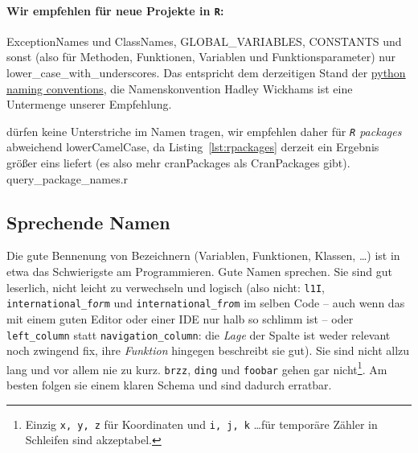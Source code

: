 \documentclass[twoside]{scrreprt}
\providecommand{\R}{\texttt{R}}
\providecommand{\code}[1]{\texttt{#1}}
\begin{document}
\paragraph{Wir empfehlen f\"u{}r neue Projekte in \R{}:}
ExceptionNames und ClassNames, GLOBAL\_VARIABLES, CONSTANTS und sonst (also
f\"u{}r Methoden, Funktionen, Variablen und Funktionsparameter) nur
lower\_case\_with\_underscores.
Das entspricht dem derzeitigen Stand der
\href{http://legacy.python.org/dev/peps/pep-0008/#naming-conventions}{python
  naming conventions}, die Namenskonvention Hadley Wickhams ist eine
  Untermenge unserer Empfehlung.

 d\"urfen keine Unterstriche im Namen
tragen, wir
empfehlen daher f\"u{}r \emph{\R{} packages} abweichend lowerCamelCase,
da Listing~\ref{lst:rpackages} derzeit ein Ergebnis gr\"o{}\ss{}er eins
liefert (es also mehr cranPackages als CranPackages gibt).
%
{query_package_names.r} 

\subsection{Sprechende Namen}
Die gute Bennenung von Bezeichnern (Variablen, Funktionen, Klassen, \ldots)
ist in etwa das Schwierigste am Programmieren.
Gute Namen sprechen.
Sie sind gut leserlich,
nicht leicht zu verwechseln und logisch (also nicht: \code{l1I},
\code{international\_f\emph{or}m} und \code{international\_f\emph{ro}m} im
selben Code -- auch wenn das mit einem guten Editor oder einer IDE nur halb so
schlimm ist -- oder \code{left\_column} statt \code{navigation\_column}: die
\emph{Lage} der Spalte ist weder relevant noch zwingend fix, ihre
\emph{Funktion} hingegen beschreibt sie gut).
Sie sind nicht allzu lang und vor allem nie zu kurz.
\code{brzz}, \code{ding} und \code{foobar} gehen gar nicht\footnote{Einzig
    \code{x, y, z} f\"ur Koordinaten und \code{i, j, k} \ldots f\"ur
    tempor\"a{}re Z\"a{}hler in Schleifen sind akzeptabel.
}.
Am besten folgen sie einem klaren Schema und sind dadurch erratbar.
\end{document}
